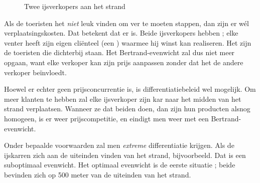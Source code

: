\begin{figure}[H]
\vspace{0.5cm}
\centering
\captionsetup{justification=centering,margin=2cm}
\caption{Twee ijsverkopers aan het strand}
\label{fig:h3strand}
\end{figure}

\par Als de toeristen het \textit{niet} leuk vinden om ver te moeten stappen, dan zijn er w\'el verplaatsingskosten. Dat betekent dat er 
 is. Beide ijsverkopers hebben  ; elke venter heeft zijn eigen cli\"enteel (een ) waarmee hij winst kan realiseren. Het zijn de toeristen die dichterbij staan. Het Bertrand-evenwicht zal dus niet meer opgaan, want elke verkoper kan zijn prijs aanpassen zonder dat het de andere verkoper be\"invloedt.\\

\par Hoewel er echter geen prijsconcurrentie is, is differentiatiebeleid wel mogelijk. Om meer klanten te hebben zal elke ijsverkoper zijn kar naar het midden van het strand verplaatsen. Wanneer ze dat beiden doen, dan zijn hun producten alsnog homogeen, is er weer prijscompetitie, en eindigt men weer met een Bertrand-evenwicht.\\

\par Onder bepaalde voorwaarden zal men \textit{extreme} differentiatie krijgen. Als de ijskarren zich aan de uiteinden vinden van het strand, bijvoorbeeld. Dat is een suboptimaal evenwicht. Het optimaal evenwicht is de eerste situatie ; beide bevinden zich op 500 meter van de uiteinden van het strand.

